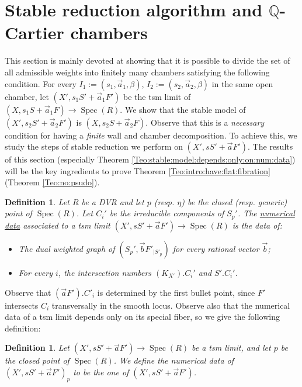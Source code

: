 \documentclass[11pt]{amsart}
\newcommand{\spec}{\operatorname{Spec}}
\newtheorem{Def}[theorem]{Definition}
\theoremstyle{definition}
\begin{document}
\section{Stable reduction algorithm and $\mathbb{Q}$-Cartier chambers}\label{Section:QCartier:threshold}
This section is mainly devoted at showing that it is possible to divide the set of all admissible weights into finitely many chambers satisfying the following condition.
For every $I_1:=(s_1,\vec{a}_1,\beta)$, $I_2:=(s_2,\vec{a}_2,\beta)$ in the same open chamber,
let $(X',s_1S'+\vec{a}_1F')$ be the tsm limit of $(X,s_1S+\vec{a}_1F)  \to \spec(R)$. We show that the stable
model of $(X',s_2S'+\vec{a}_2F')$ is $(X,s_2S+\vec{a}_2F)$. Observe that this is a \emph{necessary} condition for having
a \emph{finite} wall and chamber decomposition.
To achieve this, we study the steps of stable reduction we perform on $(X',sS'+\vec{a}F')$.
The results of this section (especially Theorem \ref{Teo:stable:model:depends:only:on:num:data}) will be the key ingredients to prove Theorem \ref{Teo:intro:have:flat:fibration}  (Theorem \ref{Teo:no:psudo}).
\begin{Def}\label{Def:numerical:data}Let $R$ be a DVR and let $p$ (resp. $\eta$) be the closed (resp. generic) point of $\spec(R)$. Let $C_i'$ be the irreducible components of $S_p'$. The \underline{numerical data} associated to a tsm limit $(X',sS'+\vec{a}F') \to \spec(R)$ is the data of:
 \begin{itemize}
  \item The dual weighted graph of $(S_p',\vec{b}F'_{|S'_p})$ for every rational vector $\vec{b}$;
  \item For every $i$, the intersection numbers $(K_{X'}).C_i'$ and $S'.C_i'$.
 \end{itemize}
\end{Def}
Observe that $(\vec{a}F').C'_i$ is determined by the first bullet point, since $F'$ intersects $C_i$ transversally in the smooth locus. Observe also that
the numerical data of a tsm limit depends only on its special fiber, so we give the following definition:
\begin{Def}\label{Def:ref:num:data:special:fiber}
 Let $(X',sS'+\vec{a}F') \to \spec(R)$ be a tsm limit, and let $p$ be the closed point of $\spec(R)$.
 We define the numerical
 data of $(X',sS'+\vec{a}F')_p$ to be the one of $(X',sS'+\vec{a}F')$.
\end{Def}
\end{document}
